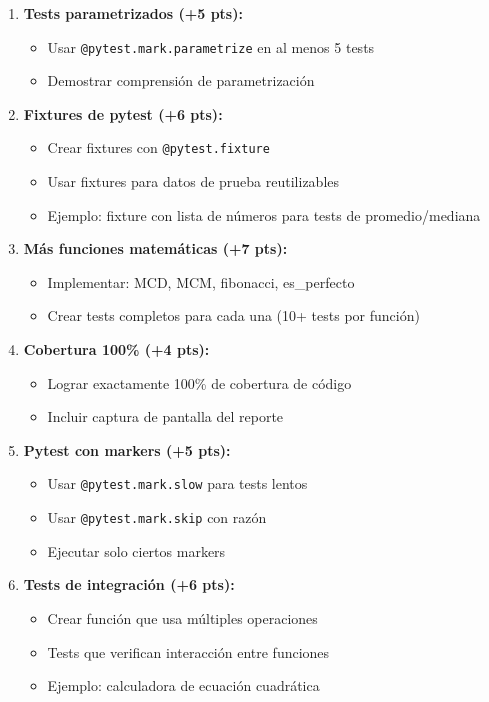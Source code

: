 \documentclass[12pt,a4paper]{article}
\begin{document}
\begin{enumerate}[leftmargin=*]
    \item \textbf{Tests parametrizados (+5 pts):}
    \begin{itemize}
        \item Usar \texttt{@pytest.mark.parametrize} en al menos 5 tests
        \item Demostrar comprensión de parametrización
    \end{itemize}
    
    \item \textbf{Fixtures de pytest (+6 pts):}
    \begin{itemize}
        \item Crear fixtures con \texttt{@pytest.fixture}
        \item Usar fixtures para datos de prueba reutilizables
        \item Ejemplo: fixture con lista de números para tests de promedio/mediana
    \end{itemize}
    
    \item \textbf{Más funciones matemáticas (+7 pts):}
    \begin{itemize}
        \item Implementar: MCD, MCM, fibonacci, es\_perfecto
        \item Crear tests completos para cada una (10+ tests por función)
    \end{itemize}
    
    \item \textbf{Cobertura 100\% (+4 pts):}
    \begin{itemize}
        \item Lograr exactamente 100\% de cobertura de código
        \item Incluir captura de pantalla del reporte
    \end{itemize}
    
    \item \textbf{Pytest con markers (+5 pts):}
    \begin{itemize}
        \item Usar \texttt{@pytest.mark.slow} para tests lentos
        \item Usar \texttt{@pytest.mark.skip} con razón
        \item Ejecutar solo ciertos markers
    \end{itemize}
    
    \item \textbf{Tests de integración (+6 pts):}
    \begin{itemize}
        \item Crear función que usa múltiples operaciones
        \item Tests que verifican interacción entre funciones
        \item Ejemplo: calculadora de ecuación cuadrática
    \end{itemize}
\end{enumerate}
\end{document}
